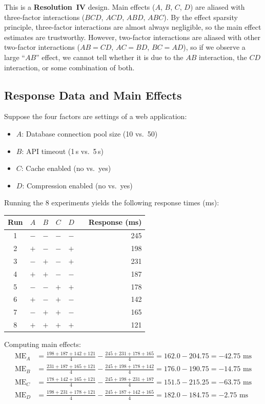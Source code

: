 \documentclass[11pt]{book}
\begin{document}
This is a \textbf{Resolution~IV} design. Main effects ($A$, $B$, $C$, $D$) are
aliased with three-factor interactions ($BCD$, $ACD$, $ABD$, $ABC$). By the
effect sparsity principle, three-factor interactions are almost always
negligible, so the main effect estimates are trustworthy. However, two-factor
interactions are aliased with other two-factor interactions ($AB = CD$,
$AC = BD$, $BC = AD$), so if we observe a large ``$AB$'' effect, we cannot tell
whether it is due to the $AB$ interaction, the $CD$ interaction, or some
combination of both.

\subsection{Response Data and Main Effects}

Suppose the four factors are settings of a web application:
\begin{itemize}[nosep]
\item $A$: Database connection pool size (10 vs.\ 50)
\item $B$: API timeout (1\,s vs.\ 5\,s)
\item $C$: Cache enabled (no vs.\ yes)
\item $D$: Compression enabled (no vs.\ yes)
\end{itemize}

\noindent Running the 8 experiments yields the following response times (ms):

\begin{center}
\begin{tabular}{ccccccr}
\toprule
Run & $A$ & $B$ & $C$ & $D$ & & Response (ms) \\
\midrule
1 & $-$ & $-$ & $-$ & $-$ & & 245 \\
2 & $+$ & $-$ & $-$ & $+$ & & 198 \\
3 & $-$ & $+$ & $-$ & $+$ & & 231 \\
4 & $+$ & $+$ & $-$ & $-$ & & 187 \\
5 & $-$ & $-$ & $+$ & $+$ & & 178 \\
6 & $+$ & $-$ & $+$ & $-$ & & 142 \\
7 & $-$ & $+$ & $+$ & $-$ & & 165 \\
8 & $+$ & $+$ & $+$ & $+$ & & 121 \\
\bottomrule
\end{tabular}
\end{center}

Computing main effects:
\begin{align*}
\text{ME}_A &= \frac{198+187+142+121}{4} - \frac{245+231+178+165}{4}
= 162.0 - 204.75 = -42.75 \text{ ms} \\
\text{ME}_B &= \frac{231+187+165+121}{4} - \frac{245+198+178+142}{4}
= 176.0 - 190.75 = -14.75 \text{ ms} \\
\text{ME}_C &= \frac{178+142+165+121}{4} - \frac{245+198+231+187}{4}
= 151.5 - 215.25 = -63.75 \text{ ms} \\
\text{ME}_D &= \frac{198+231+178+121}{4} - \frac{245+187+142+165}{4}
= 182.0 - 184.75 = -2.75 \text{ ms}
\end{align*}
\end{document}
